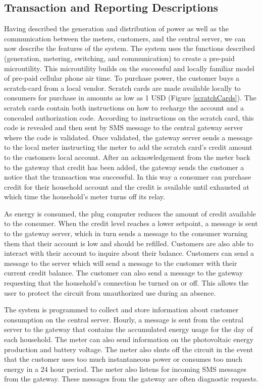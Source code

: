 \documentclass{sig-alternate}
\begin{document}
\subsection{Transaction and Reporting Descriptions}
Having described the generation and distribution of power as well as the
communication between the meters, customers, and the central server, we
can now describe the features of the system.
The system uses the functions described (generation, metering, switching,
and communication) to create a pre-paid microutility.
This microutility builds on the successful and locally familiar model of
pre-paid cellular phone air time.
To purchase power, the customer buys a scratch-card from a local vendor.
Scratch cards are made available locally to consumers for purchase in
amounts as low as 1 USD (Figure \ref{scratchCards}).
The scratch cards contain both instructions on how to recharge the account
and a concealed authorization code.
According to instructions on the scratch card, this code is revealed and
then sent by SMS message to the central gateway server where the code is
validated.
Once validated, the gateway server sends a message to the local meter
instructing the meter to add the scratch card's credit amount to the
customers local account.
After an acknowledgement from the meter back to the gateway that credit
has been added, the gateway sends the customer a notice that the transaction
was successful.
In this way a consumer can purchase credit for their household account and
the credit is available until exhausted at which time the household's meter
turns off its relay.

As energy is consumed, the plug computer reduces the amount of credit
available to the consumer.
When the credit level reaches a lower setpoint, a message is sent
to the gateway server, which in turn sends a message to the consumer warning them
that their account is low and should be refilled.
Customers are also able to interact with their account to inquire about their
balance.  Customers can send a message to the server which will send a message
to the customer with their current credit balance.
The customer can also send a message to the gateway requesting that the household's
connection be turned on or off.  This allows the user to protect the circuit
from unauthorized use during an absence.

The system is programmed to collect and store information about customer
consumption on the central server.
Hourly, a message is sent from the central server to the gateway that contains
the accumulated energy usage for the day of each household.
The meter can also send information on the photovoltaic energy production
and battery voltage.
The meter also shuts off the circuit in the event that the customer uses too
much instantaneous power or consumes too much energy in a 24 hour period.
The meter also listens for incoming SMS messages from the gateway.
These messages from the gateway are often diagnostic requests.
\end{document}
